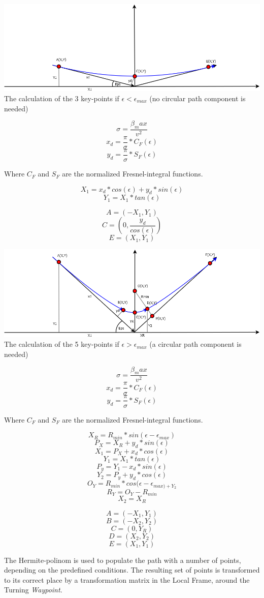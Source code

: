 \begin{center}
\includegraphics[width = \textwidth]{img/LocalPlannerFigures/3Points.png}
The calculation of the 3 key-points if $\epsilon < \epsilon_{max}$ (no circular path component is needed)

$$ \sigma = \frac{\beta_max}{v^2} $$
$$x_d = \frac{\pi}{\sigma} * C_F(\epsilon)$$
$$y_d = \frac{\pi}{\sigma} * S_F(\epsilon)$$

Where $C_F$ and $S_F$ are the normalized Fresnel-integral functions.

$$X_1 = x_d * cos(\epsilon) + y_d * sin(\epsilon)$$
$$Y_1 = X_1 * tan(\epsilon)$$

$$A = (-X_1, Y_1)$$
$$C = (0, \frac{y_d}{cos(\epsilon)})$$
$$E = (X_1, Y_1)$$

\includegraphics[width = \textwidth]{img/LocalPlannerFigures/5Points.png}
The calculation of the 5 key-points if $\epsilon > \epsilon_{max}$ (a circular path component is needed)

$$ \sigma = \frac{\beta_max}{v^2} $$
$$x_d = \frac{\pi}{\sigma} * C_F(\epsilon)$$
$$y_d = \frac{\pi}{\sigma} * S_F(\epsilon)$$

Where $C_F$ and $S_F$ are the normalized Fresnel-integral functions.

$$X_R = R_{min} * sin(\epsilon - \epsilon_{max})$$
$$P_X = X_R + y_d * sin(\epsilon)$$
$$X_1 = P_X + x_d * cos(\epsilon)$$
$$Y_1 = X_1 * tan(\epsilon)$$
$$P_y = Y_1 - x_d * sin(\epsilon)$$
$$Y_2 = P_y + y_d * cos(\epsilon)$$
$$O_Y = R_{min} * cos(\epsilon-\epsilon_{max) + Y_2}$$
$$R_Y = O_Y - R_{min}$$
$$X_2 = X_R$$

$$A = (-X_1, Y_1)$$
$$B = (-X_2, Y_2)$$
$$C = (0, Y_R)$$
$$D = (X_2, Y_2)$$
$$E = (X_1, Y_1)$$

\end{center}
The Hermite-polinom is used to populate the path with a number of points, depending on the predefined conditions. The resulting set of points is transformed to its correct place by a transformation matrix in the Local Frame, around the Turning \emph{Waypoint}.

